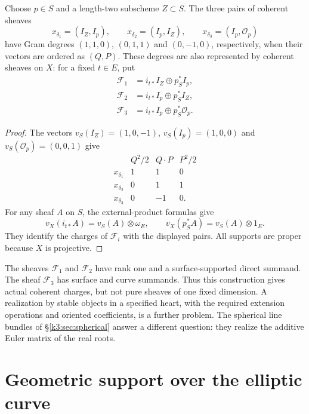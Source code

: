 \begin{proposition}
\label{prop:type-ii-compact-mukai-representatives}
Choose $p\in S$ and a length-two subscheme $Z\subset S$.  The three
pairs of coherent sheaves
\[
x_{\delta_1}=(I_Z,I_p),\qquad
x_{\delta_2}=(I_p,I_Z),\qquad
x_{\delta_3}=(I_p,\mathcal O_p)
\]
have Gram degrees $(1,1,0)$, $(0,1,1)$ and $(0,-1,0)$,
respectively, when their vectors are ordered as $(Q,P)$.
These degrees are also represented by coherent sheaves on $X$:
for a fixed $t\in E$, put
\[
\begin{aligned}
\mathcal F_1&=i_{t*}I_Z\oplus p_S^*I_p,\\
\mathcal F_2&=i_{t*}I_p\oplus p_S^*I_Z,\\
\mathcal F_3&=i_{t*}I_p\oplus p_S^*\mathcal O_p.
\end{aligned}
\]
\end{proposition}

\begin{proof}
The vectors $v_S(I_Z)=(1,0,-1)$, $v_S(I_p)=(1,0,0)$ and
$v_S(\mathcal O_p)=(0,0,1)$ give
\[
\begin{array}{c|c|c|c}
&Q^2/2&Q\cdot P&P^2/2\\ \hline
x_{\delta_1}&1&1&0\\
x_{\delta_2}&0&1&1\\
x_{\delta_3}&0&-1&0.
\end{array}
\]
For any sheaf $A$ on $S$, the external-product formulas give
\[
v_X(i_{t*}A)=v_S(A)\otimes\omega_E,\qquad
v_X(p_S^*A)=v_S(A)\otimes1_E.
\]
They identify the charges of $\mathcal F_i$ with the displayed
pairs.  All supports are proper because $X$ is projective.
\end{proof}

The sheaves $\mathcal F_1$ and $\mathcal F_2$ have rank one and a
surface-supported direct summand.  The sheaf $\mathcal F_3$ has surface and
curve summands.  Thus this construction gives actual coherent
charges, but not pure sheaves of one fixed dimension.  A realization
by stable objects in a specified heart, with the required extension
operations and oriented coefficients, is a further problem.  The
spherical line bundles of \S\ref{k3:sec:spherical} answer a different
question: they realize the additive Euler matrix of the real roots.

\section{Geometric support over the elliptic curve}
\label{sec:k3xe-hybrid-ran-carrier}
\label{subsec:projection-locality-obstruction}

